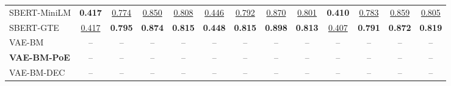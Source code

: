 \begin{table}[t]
{\begin{tabular}{lcccccccccccc}
SBERT-MiniLM & \textbf{0.417} & \underline{0.774} & \underline{0.850} & \underline{0.808} & \underline{0.446} & \underline{0.792} & \underline{0.870} & \underline{0.801} & \textbf{0.410} & \underline{0.783} & \underline{0.859} & \underline{0.805} \\
SBERT-GTE & \underline{0.417} & \textbf{0.795} & \textbf{0.874} & \textbf{0.815} & \textbf{0.448} & \textbf{0.815} & \textbf{0.898} & \textbf{0.813} & \underline{0.407} & \textbf{0.791} & \textbf{0.872} & \textbf{0.819} \\
\midrule
VAE-BM & -- & -- & -- & -- & -- & -- & -- & -- & -- & -- & -- & -- \\
\textbf{VAE-BM-PoE} & -- & -- & -- & -- & -- & -- & -- & -- & -- & -- & -- & -- \\
VAE-BM-DEC & -- & -- & -- & -- & -- & -- & -- & -- & -- & -- & -- & -- \\
\bottomrule
\end{tabular}
}
\end{table}
